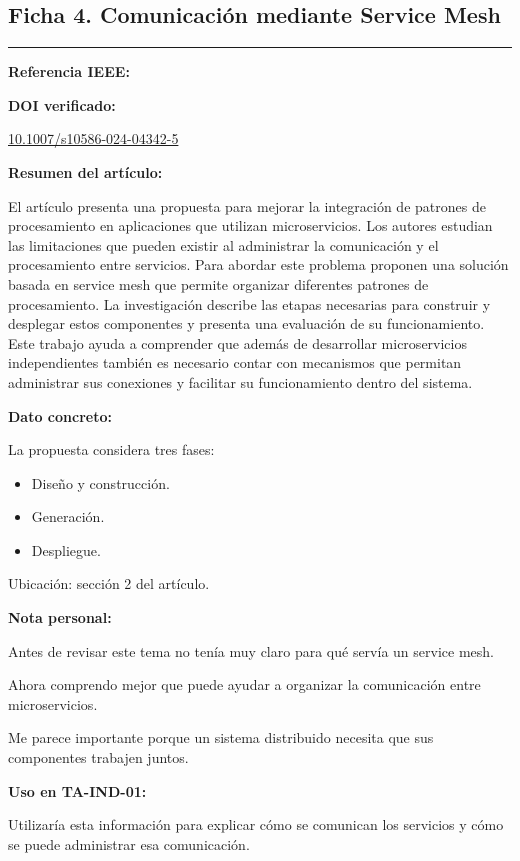 \documentclass[12pt,a4paper]{article}
\newcommand{\ficha}[7]{

\subsection*{#1}

\noindent
{\color{azul}\rule{\linewidth}{0.8pt}}

\textbf{Referencia IEEE:}

\fullcite{#2}

\textbf{DOI verificado:}

\href{https://doi.org/#3}{#3}

\textbf{Resumen del artículo:}

#4

\textbf{Dato concreto:}

#5

\textbf{Nota personal:}

#6

\textbf{Uso en TA-IND-01:}

#7

\vspace{6mm}
}
\begin{document}
\ficha
{Ficha 4. Comunicación mediante Service Mesh}
{nicolas2024}
{10.1007/s10586-024-04342-5}
{
El artículo presenta una propuesta
para mejorar la integración de
patrones de procesamiento en
aplicaciones que utilizan
microservicios. Los autores
estudian las limitaciones
que pueden existir al administrar
la comunicación y el procesamiento
entre servicios. Para abordar
este problema proponen una solución
basada en service mesh que permite
organizar diferentes patrones
de procesamiento. La investigación
describe las etapas necesarias
para construir y desplegar estos
componentes y presenta una
evaluación de su funcionamiento.
Este trabajo ayuda a comprender
que además de desarrollar
microservicios independientes
también es necesario contar
con mecanismos que permitan
administrar sus conexiones
y facilitar su funcionamiento
dentro del sistema.
}
{
La propuesta considera tres fases:

\begin{itemize}[nosep]
\item Diseño y construcción.
\item Generación.
\item Despliegue.
\end{itemize}

Ubicación: sección 2 del artículo.
}
{
Antes de revisar este tema
no tenía muy claro para qué
servía un service mesh.

Ahora comprendo mejor que puede
ayudar a organizar la comunicación
entre microservicios.

Me parece importante porque
un sistema distribuido necesita
que sus componentes trabajen juntos.
}
{
Utilizaría esta información
para explicar cómo se comunican
los servicios y cómo se puede
administrar esa comunicación.
}

\end{document}
